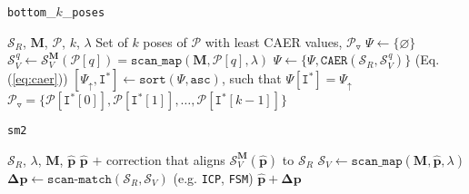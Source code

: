 \begin{algorithm}[H]
  \caption{\texttt{bottom}\_$k$\_\texttt{poses}}
  \begin{spacing}{1.0}
  \begin{algorithmic}[1]
    \REQUIRE $\mathcal{S}_R$, $\bm{M}$, $\mathcal{P}$, $k$, $\lambda$
    \ENSURE Set of $k$ poses of $\mathcal{P}$ with least CAER values, $\mathcal{P}_{\triangledown}$
    \STATE $\Psi \leftarrow \{\varnothing \}$
      \STATE $\mathcal{S}_V^{\hspace{1pt} q} \leftarrow \mathcal{S}_V^{\bm{M}}(\mathcal{P}[q]) = \texttt{scan\_map}(\bm{M}, \mathcal{P}[q], \lambda)$
      \STATE $\Psi \leftarrow \{\Psi, \texttt{CAER}(\mathcal{S}_R, \mathcal{S}_V^{\hspace{1pt} q}) \}$ \hfill {\small (Eq. (\ref{eq:caer})})
    \ENDFOR
    \STATE $[\Psi_{\uparrow}, \texttt{I}^{\ast}] \leftarrow \texttt{sort}(\Psi, \texttt{asc})$, such that $\Psi[\texttt{I}^{\ast}] = \Psi_{\uparrow}$
    \RETURN $\mathcal{P}_{\triangledown} = \{\mathcal{P}[\texttt{I}^{\ast}[0]], \mathcal{P}[\texttt{I}^{\ast}[1]], \dots, \mathcal{P}[\texttt{I}^{\ast}[k-1]]\}$
  \end{algorithmic}
  \end{spacing}
  \label{alg:bottom_k}
\end{algorithm}

\begin{algorithm}[H]
  \caption{\texttt{sm2}}
  \begin{spacing}{1.0}
  \begin{algorithmic}[1]
    \REQUIRE $\mathcal{S}_R$, $\lambda$, $\bm{M}$, $\hat{\bm{p}}$
    \ENSURE $\hat{\bm{p}}$ $+$ correction that aligns $\mathcal{S}_V^{\bm{M}}(\hat{\bm{p}})$ to $\mathcal{S}_R$
    \STATE $\mathcal{S}_V \leftarrow \texttt{scan\_map}(\bm{M}, \hat{\bm{p}}, \lambda)$
    \STATE $\bm{\Delta p} \leftarrow \texttt{scan-match}(\mathcal{S}_R,\mathcal{S}_V)$ \hfill {\footnotesize (e.g. \texttt{ICP}\cite{Vizzo2023}, \texttt{FSM}\cite{Filotheou2022f}})
    \RETURN $\hat{\bm{p}} + \bm{\Delta p}$
  \end{algorithmic}
  \end{spacing}
  \label{alg:sm2}
\end{algorithm}
